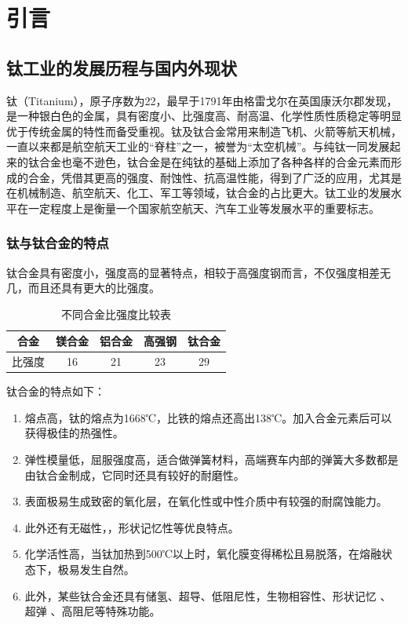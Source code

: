 \chapter{引言}
\section{钛工业的发展历程与国内外现状}

钛（Titanium），原子序数为22，最早于1791年由格雷戈尔在英国康沃尔郡发现，是一种银白色的金属，具有密度小、比强度高、耐高温、化学性质性质稳定等明显优于传统金属的特性而备受重视。钛及钛合金常用来制造飞机、火箭等航天机械，一直以来都是航空航天工业的“脊柱”之一，被誉为“太空机械”\cite{XJYS200102014}。与纯钛一同发展起来的钛合金也毫不逊色，钛合金是在纯钛的基础上添加了各种各样的合金元素而形成的合金，凭借其更高的强度、耐蚀性、抗高温性能，得到了广泛的应用，尤其是在机械制造、航空航天、化工、军工等领域，钛合金的占比更大。钛工业的发展水平在一定程度上是衡量一个国家航空航天、汽车工业等发展水平的重要标志\cite{HSJJ202109005}。

\subsection{钛与钛合金的特点}
钛合金具有密度小，强度高的显著特点，相较于高强度钢而言，不仅强度相差无几，而且还具有更大的比强度。

\begin{table}[htbp]
	\centering
	\label{sec:bqd}
	\caption{不同合金比强度比较表}
	\begin{tabular}{ccccc}
		\toprule
		\textbf{合金} & \textbf{镁合金} & \textbf{铝合金} & \textbf{高强钢} & \textbf{钛合金} \\
		\midrule
		比强度 & 16 & 21 & 23 & 29 \\
		\bottomrule
	\end{tabular}
\end{table}

钛合金的特点如下\cite{1997titanium}：
\begin{enumerate}
	\item 熔点高，钛的熔点为1668℃，比铁的熔点还高出138℃。加入合金元素后可以获得极佳的热强性。
	\item 弹性模量低，屈服强度高，适合做弹簧材料，高端赛车内部的弹簧大多数都是由钛合金制成，它同时还具有较好的耐磨性。
	\item 表面极易生成致密的氧化层，在氧化性或中性介质中有较强的耐腐蚀能力。
	\item 此外还有无磁性，，形状记忆性等优良特点。
	\item 化学活性高，当钛加热到500℃以上时，氧化膜变得稀松且易脱落，在熔融状态下，极易发生自然。
	\item 此外，某些钛合金还具有储氢、超导、低阻尼性，生物相容性、形状记忆 、 超弹 、高阻尼等特殊功能。
\end{enumerate}

